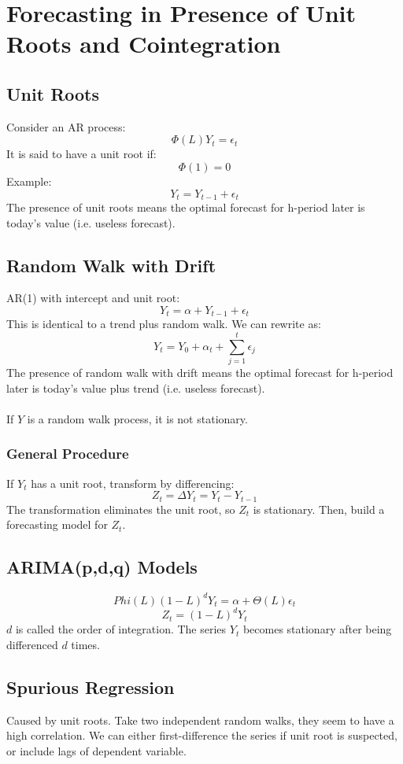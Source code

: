 \documentclass{article}
\begin{document}
\section{Forecasting in Presence of Unit Roots and Cointegration}
\subsection{Unit Roots}
Consider an AR process:
$$\Phi(L) Y_t = \epsilon_t$$
It is said to have a unit root if:
$$\Phi(1) = 0$$
Example:
$$Y_t = Y_{t-1} + \epsilon_t$$
The presence of unit roots means the optimal forecast for h-period later is today's value (i.e. useless forecast).

\subsection{Random Walk with Drift}
AR(1) with intercept and unit root:
$$Y_t = \alpha + Y_{t-1} + \epsilon_t$$
This is identical to a trend plus random walk. We can rewrite as:
$$Y_t = Y_0 + \alpha_t + \sum_{j=1}^t \epsilon_j$$
The presence of random walk with drift means the optimal forecast for h-period later is today's value plus trend (i.e. useless forecast).\\
\\
If $Y$ is a random walk process, it is not stationary.

\subsubsection{General Procedure}
If $Y_t$ has a unit root, transform by differencing:
$$Z_t = \Delta Y_t = Y_t - Y_{t-1}$$
The transformation eliminates the unit root, so $Z_t$ is stationary. Then, build a forecasting model for $Z_t$.

\subsection{ARIMA(p,d,q) Models}
$$Phi(L)(1-L)^d Y_t = \alpha + \Theta (L)\epsilon_t$$
$$Z_t = (1-L)^d Y_t$$
$d$ is called the order of integration. The series $Y_t$ becomes stationary after being differenced $d$ times. 

\subsection{Spurious Regression}
Caused by unit roots. Take two independent random walks, they seem to have a high correlation. We can either first-difference the series if unit root is suspected, or include lags of dependent variable.
\end{document}
